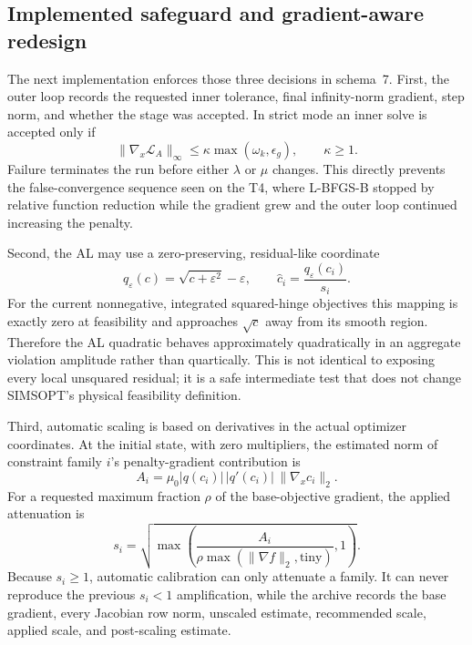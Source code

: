 \documentclass[11pt,a4paper]{article}
\begin{document}
\subsection{Implemented safeguard and gradient-aware redesign}

The next implementation enforces those three decisions in schema~7.  First,
the outer loop records the requested inner tolerance, final infinity-norm
gradient, step norm, and whether the stage was accepted.  In strict mode an
inner solve is accepted only if
\[
  \|\nabla_x \mathcal L_A\|_\infty
  \leq \kappa\max(\omega_k,\epsilon_g),\qquad \kappa\geq 1.
\]
Failure terminates the run before either $\lambda$ or $\mu$ changes.  This
directly prevents the false-convergence sequence seen on the T4, where
L-BFGS-B stopped by relative function reduction while the gradient grew and
the outer loop continued increasing the penalty.

Second, the AL may use a zero-preserving, residual-like coordinate
\[
 q_\varepsilon(c)=\sqrt{c+\varepsilon^2}-\varepsilon,
 \qquad \widehat c_i=\frac{q_\varepsilon(c_i)}{s_i}.
\]
For the current nonnegative, integrated squared-hinge objectives this mapping
is exactly zero at feasibility and approaches $\sqrt c$ away from its smooth
region.  Therefore the AL quadratic behaves approximately quadratically in an
aggregate violation amplitude rather than quartically.  This is not identical
to exposing every local unsquared residual; it is a safe intermediate test that
does not change SIMSOPT's physical feasibility definition.

Third, automatic scaling is based on derivatives in the actual optimizer
coordinates.  At the initial state, with zero multipliers, the estimated norm
of constraint family $i$'s penalty-gradient contribution is
\[
 A_i=\mu_0|q(c_i)|\,|q'(c_i)|\,\|\nabla_xc_i\|_2.
\]
For a requested maximum fraction $\rho$ of the base-objective gradient, the
applied attenuation is
\[
 s_i=\sqrt{\max\!\left(\frac{A_i}
 {\rho\max(\|\nabla f\|_2,\mathrm{tiny})},1\right)}.
\]
Because $s_i\geq1$, automatic calibration can only attenuate a family.  It can
never reproduce the previous $s_i<1$ amplification, while the archive records
the base gradient, every Jacobian row norm, unscaled estimate, recommended
scale, applied scale, and post-scaling estimate.
\end{document}
